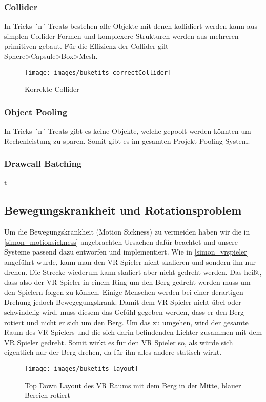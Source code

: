 \subsubsection{Collider}
 In Tricks ´n´ Treats bestehen alle Objekte mit denen kollidiert werden kann aus simplen Collider Formen und komplexere Strukturen werden aus mehreren primitiven gebaut. 
 Für die Effizienz der Collider gilt Sphere>Capsule>Box>Mesh.
\begin{figure}[H]
	\centering
	\texttt{[image: images/buketits\_correctCollider]}
	\caption{Korrekte Collider}
\end{figure}

\subsubsection{Object Pooling}
In Tricks ´n´ Treats gibt es keine Objekte, welche gepoolt werden könnten um Rechenleistung zu sparen. Somit gibt es im gesamten Projekt Pooling System.

\subsubsection{Drawcall Batching}
t

\subsection{Bewegungskrankheit und Rotationsproblem}
Um die Bewegungskrankheit (Motion Sickness) zu vermeiden haben wir die in \ref{simon_motionsickness} angebrachten Ursachen dafür beachtet und unsere Systeme passend dazu entworfen und implementiert.
Wie in \ref{simon_vrspieler} angeführt wurde, kann man den VR Spieler nicht skalieren und sondern ihn nur drehen. Die Strecke wiederum kann skaliert aber nicht gedreht werden. Das heißt, dass also der VR Spieler in einem Ring um den Berg gedreht werden muss um den Spielern folgen zu können. Einige Menschen werden bei einer derartigen Drehung jedoch Bewegegungskrank. Damit dem VR Spieler nicht übel oder schwindelig wird, muss diesem das Gefühl gegeben werden, dass er den Berg rotiert und nicht er sich um den Berg. Um das zu umgehen, wird der gesamte Raum des VR Spielers und die sich darin befindenden Lichter zusammen mit dem VR Spieler gedreht. Somit wirkt es für den VR Spieler so, als würde sich eigentlich nur der Berg drehen, da für ihn alles andere statisch wirkt.

\begin{figure}[h]
	\centering
	\texttt{[image: images/buketits\_layout]}
	\caption{Top Down Layout des VR Raums mit dem Berg in der Mitte, blauer Bereich rotiert}
\end{figure}



